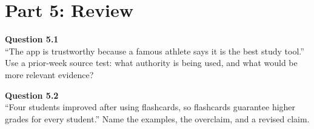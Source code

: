 \documentclass[12pt]{article}
\begin{document}

\newpage

\section*{Part 5: Review}

\textbf{Question 5.1}\\[-0.15em]
``The app is trustworthy because a famous athlete says it is the best study tool.'' Use a prior-week source test: what authority is being used, and what would be more relevant evidence?


\textbf{Question 5.2}\\[-0.15em]
``Four students improved after using flashcards, so flashcards guarantee higher grades for every student.'' Name the examples, the overclaim, and a revised claim.

\end{document}
